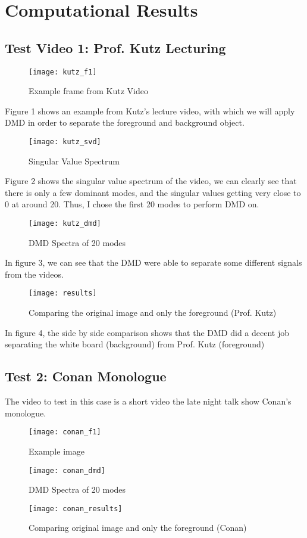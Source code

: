 \documentclass[12pt, a4paper]{article}
\begin{document}
\section{Computational Results}
\subsection{Test Video 1: Prof. Kutz Lecturing}
\begin{figure}[H]
\centering
\texttt{[image: kutz\_f1]}
\caption{Example frame from Kutz Video}
\end{figure}

Figure 1 shows an example from Kutz's lecture video, with which we will apply DMD in order to separate the foreground and background object.

\begin{figure}[H]
\centering
\texttt{[image: kutz\_svd]}
\caption{Singular Value Spectrum}
\end{figure}
Figure 2 shows the singular value spectrum of the video, we can clearly see that there is only a few dominant modes, and the singular values getting very close to 0 at around 20. Thus, I chose the first 20 modes to perform DMD on.

\begin{figure}[H]
\centering
\texttt{[image: kutz\_dmd]}
\caption{DMD Spectra of 20 modes}
\end{figure}

In figure 3, we can see that the DMD were able to separate some different signals from the videos. 

\begin{figure}[H]
\centering
\texttt{[image: results]}
\caption{Comparing the original image and only the foreground (Prof. Kutz)}
\end{figure}

In figure 4, the side by side comparison shows that the DMD did a decent job separating the white board (background) from Prof. Kutz (foreground)

\subsection{Test 2: Conan Monologue}
The video to test in this case is a short video the late night talk show Conan's monologue.

\begin{figure}[H]
\centering
\texttt{[image: conan\_f1]}
\caption{Example image}
\end{figure}
\begin{figure}[H]
\centering
\texttt{[image: conan\_dmd]}
\caption{DMD Spectra of 20 modes}
\end{figure}
\begin{figure}[H]
\texttt{[image: conan\_results]}
\caption{Comparing original image and only the foreground (Conan)}
\end{figure}
\end{document}
